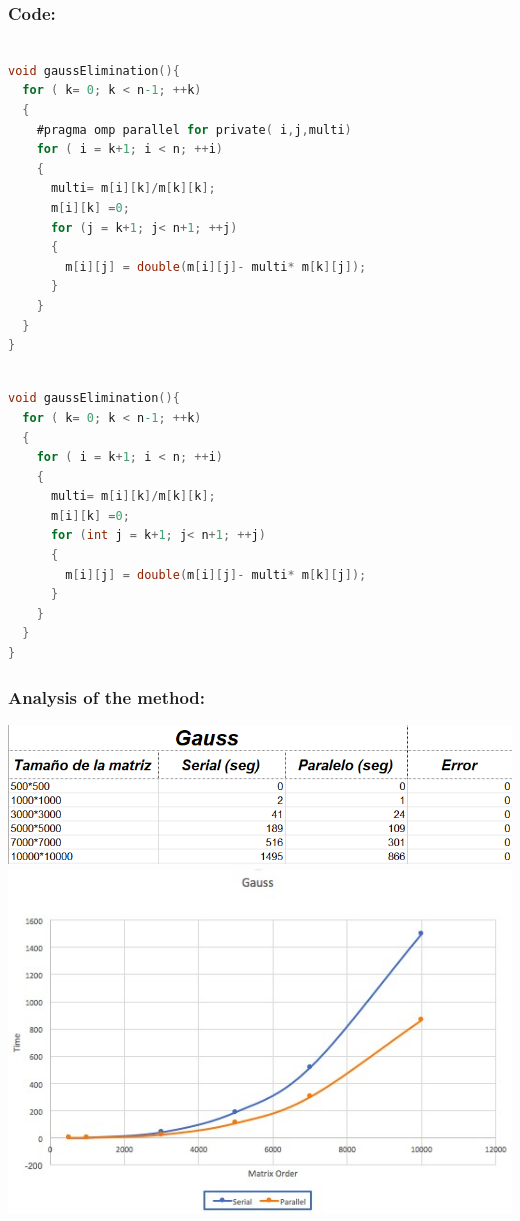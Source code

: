 \documentclass{article}
\newcounter{subsubsubsection}[subsubsection]
\begin{document}
\subsubsection{Code:}


\begin{lstlisting}[language=C]

void gaussElimination(){
  for ( k= 0; k < n-1; ++k)
  {
    #pragma omp parallel for private( i,j,multi)
    for ( i = k+1; i < n; ++i)
    {
      multi= m[i][k]/m[k][k];
      m[i][k] =0;
      for (j = k+1; j< n+1; ++j)
      {
        m[i][j] = double(m[i][j]- multi* m[k][j]);
      }
    }
  }
}

\end{lstlisting}


\begin{lstlisting}[language=C]

void gaussElimination(){
  for ( k= 0; k < n-1; ++k)
  {
    for ( i = k+1; i < n; ++i)
    {
      multi= m[i][k]/m[k][k];
      m[i][k] =0;
      for (int j = k+1; j< n+1; ++j)
      {
        m[i][j] = double(m[i][j]- multi* m[k][j]);
      }
    }
  }
}
\end{lstlisting}

\subsubsection{Analysis of the method:}
\includegraphics[width=\linewidth]{./images/gauss.PNG}\\

\includegraphics[width=\linewidth]{./images/gg.jpeg}\\
\end{document}
